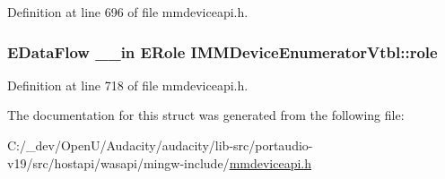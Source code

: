 Definition at line 696 of file mmdeviceapi.\+h.

\subsubsection[{\texorpdfstring{role}{role}}]{ {\bf E\+Data\+Flow} {\bf \+\_\+\+\_\+in} {\bf E\+Role} I\+M\+M\+Device\+Enumerator\+Vtbl\+::role}\hypertarget{struct_i_m_m_device_enumerator_vtbl_a5c33dfef61ec24c862ae4d26c8667c58}{}\label{struct_i_m_m_device_enumerator_vtbl_a5c33dfef61ec24c862ae4d26c8667c58}


Definition at line 718 of file mmdeviceapi.\+h.



The documentation for this struct was generated from the following file\+:\begin{DoxyCompactItemize}
\item 
C\+:/\+\_\+dev/\+Open\+U/\+Audacity/audacity/lib-\/src/portaudio-\/v19/src/hostapi/wasapi/mingw-\/include/\hyperlink{mmdeviceapi_8h}{mmdeviceapi.\+h}\end{DoxyCompactItemize}
